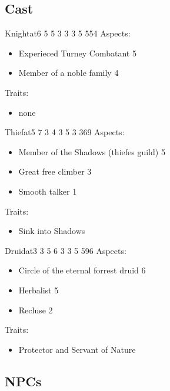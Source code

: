 \documentclass[11pt]{article}
\begin{document}
{\subsection{Cast}
\label{sec:org0d25b6b}

\begin{npc}{Knight}{at}{6 5 5 3 3 3 5 5}{54}
Aspects:
\begin{itemize}
\item Experieced Turney Combatant 5
\item Member of a noble family 4
\end{itemize}

\columnbreak

Traits:
\begin{itemize}
\item none
\end{itemize}
\end{npc}

\begin{npc}{Thief}{at}{5 7 3 4 3 5 3 3}{69}
Aspects:
\begin{itemize}
\item Member of the Shadows (thiefes guild) 5
\item Great free climber 3
\item Smooth talker 1
\end{itemize}

\columnbreak

Traits:
\begin{itemize}
\item Sink into Shadows
\end{itemize}
\end{npc}

\begin{npc}{Druid}{at}{3 3 5 6 3 3 5 5}{96}
Aspects:
\begin{itemize}
\item Circle of the eternal forrest druid 6
\item Herbalist 5
\item Recluse 2
\end{itemize}

\columnbreak

Traits:
\begin{itemize}
\item Protector and Servant of Nature
\end{itemize}
\end{npc}
\subsection{NPCs}
\label{sec:orgccbd361}

}
\end{document}
